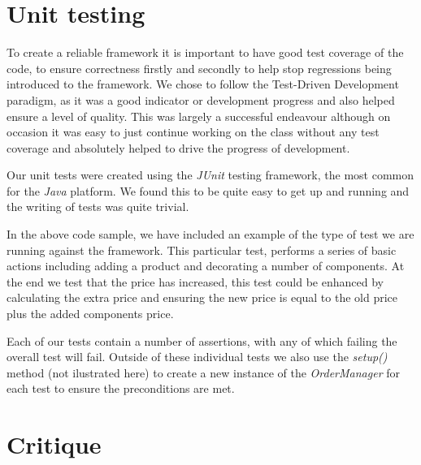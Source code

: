 \documentclass[pdftex,11pt,a4paper]{article}
\begin{document}
\pagebreak

\section{Unit testing}

To create a reliable framework it is important to have good test coverage of the code, to ensure correctness firstly and secondly to help stop regressions being introduced to the framework. We chose to follow the Test-Driven Development paradigm, as it was a good indicator or development progress and also helped ensure a level of quality. This was largely a successful endeavour although on occasion it was easy to just continue working on the class without any test coverage and absolutely helped to drive the progress of development.

Our unit tests were created using the \emph{JUnit} testing framework\cite{website:junit}, the most common for the \emph{Java} platform. We found this to be quite easy to get up and running and the writing of tests was quite trivial.



In the above code sample, we have included an example of the type of test we are running against the framework. This particular test, performs a series of basic actions including adding a product and decorating a number of components. At the end we test that the price has increased, this test could be enhanced by calculating the extra price and ensuring the new price is equal to the old price plus the added components price.

Each of our tests contain a number of assertions, with any of which failing the overall test will fail. Outside of these individual tests we also use the \emph{setup()} method (not ilustrated here) to create a new instance of the \emph{OrderManager} for each test to ensure the preconditions are met.
\pagebreak


\section{Critique}
\end{document}
